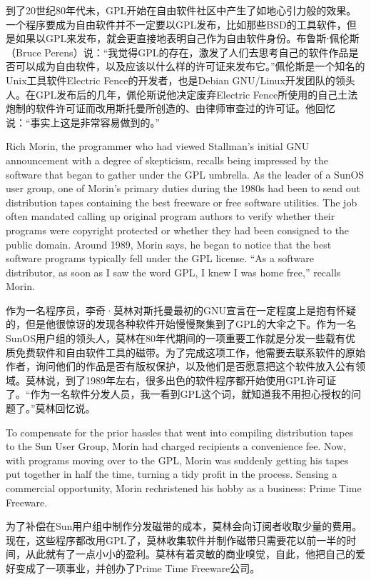 \ifdefined\chs
到了20世纪80年代未，GPL开始在自由软件社区中产生了如地心引力般的效果。一个程序要成为自由软件并不一定要以GPL发布，比如那些BSD的工具软件，但是如果以GPL来发布，就会更直接地表明自己作为自由软件身份。布鲁斯⋅佩伦斯（Bruce Perens）说：``我觉得GPL的存在，激发了人们去思考自己的软件作品是否可以成为自由软件，以及应该以什么样的许可证来发布它。''佩伦斯是一个知名的Unix工具软件Electric Fence的开发者，也是Debian GNU/Linux开发团队的领头人。在GPL发布后的几年，佩伦斯说他决定废弃Electric Fence所使用的自己土法炮制的软件许可证而改用斯托曼所创造的、由律师审查过的许可证。他回忆说：``事实上这是非常容易做到的。''
\fi

\ifdefined\eng
Rich Morin, the programmer who had viewed Stallman's initial GNU announcement with a degree of skepticism, recalls being impressed by the software that began to gather under the GPL umbrella. As the leader of a SunOS user group, one of Morin's primary duties during the 1980s had been to send out distribution tapes containing the best freeware or free software utilities. The job often mandated calling up original program authors to verify whether their programs were copyright protected or whether they had been consigned to the public domain. Around 1989, Morin says, he began to notice that the best software programs typically fell under the GPL license. ``As a software distributor, as soon as I saw the word GPL, I knew I was home free,'' recalls Morin.
\fi

\ifdefined\chs
作为一名程序员，李奇·莫林对斯托曼最初的GNU宣言在一定程度上是抱有怀疑的，但是他很惊讶的发现各种软件开始慢慢聚集到了GPL的大伞之下。作为一名SunOS用户组的领头人，莫林在80年代期间的一项重要工作就是分发一些载有优质免费软件和自由软件工具的磁带。为了完成这项工作，他需要去联系软件的原始作者，询问他们的作品是否有版权保护，以及他们是否愿意把这个软件放入公有领域。莫林说，到了1989年左右，很多出色的软件程序都开始使用GPL许可证了。``作为一名软件分发人员，我一看到GPL这个词，就知道我不用担心授权的问题了。''莫林回忆说。
\fi

\ifdefined\eng
To compensate for the prior hassles that went into compiling distribution tapes to the Sun User Group, Morin had charged recipients a convenience fee. Now, with programs moving over to the GPL, Morin was suddenly getting his tapes put together in half the time, turning a tidy profit in the process. Sensing a commercial opportunity, Morin rechristened his hobby as a business: Prime Time Freeware.
\fi

\ifdefined\chs
为了补偿在Sun用户组中制作分发磁带的成本，莫林会向订阅者收取少量的费用。现在，这些程序都改用GPL了，莫林收集软件并制作磁带只需要花以前一半的时间，从此就有了一点小小的盈利。莫林有着灵敏的商业嗅觉，自此，他把自己的爱好变成了一项事业，并创办了Prime Time Freeware公司。
\fi

